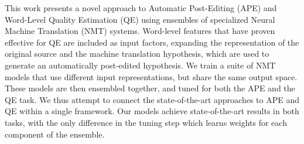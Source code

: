 This work presents a novel approach to Automatic Post-Editing (APE) and Word-Level Quality Estimation (QE) using ensembles of specialized Neural Machine Translation (NMT) systems. Word-level features that have proven effective for QE are included as input factors, expanding the representation of the original source and the machine translation hypothesis, which are used to generate an automatically post-edited hypothesis. We train a suite of NMT models that use different input representations, but share the same output space. These models are then ensembled together, and tuned for both the APE and the QE task. We thus attempt to connect the state-of-the-art approaches to APE and QE within a single framework. Our models achieve state-of-the-art results in both tasks, with the only difference in the tuning step which learns weights for each component of the ensemble.
